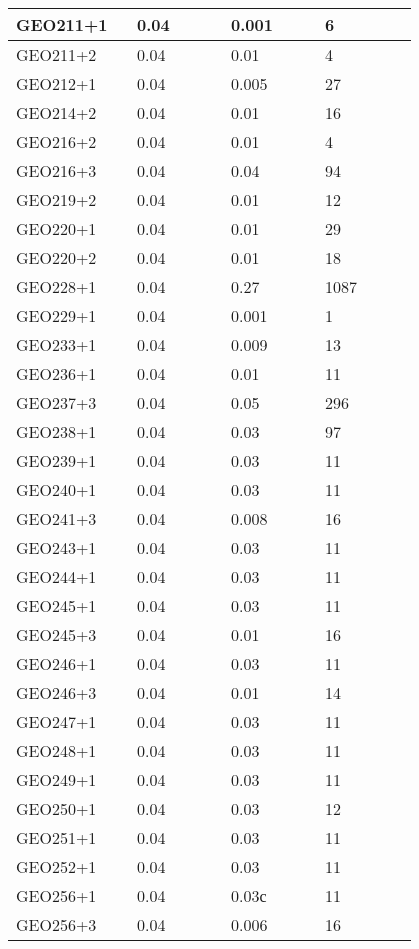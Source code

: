 \begin{longtable}[H]{|p{0.2\linewidth}|p{0.2\linewidth}|p{0.2\linewidth}|p{0.2\linewidth}|}
\hline
GEO211+1 &  0.04 &  0.001 &  6 \\
\hline
GEO211+2 &  0.04 &  0.01 &  4 \\
\hline
GEO212+1 &  0.04 &  0.005 &  27 \\
\hline
GEO214+2 &  0.04 &  0.01 &  16 \\
\hline
GEO216+2 &  0.04 &  0.01 &  4 \\
\hline
GEO216+3 &  0.04 &  0.04 &  94 \\
\hline
GEO219+2 &  0.04 &  0.01 &  12 \\
\hline
GEO220+1 &  0.04 &  0.01 &  29 \\
\hline
GEO220+2 &  0.04 &  0.01 &  18 \\
\hline
GEO228+1 &  0.04 &  0.27 &  1087 \\
\hline
GEO229+1 &  0.04 &  0.001 &  1 \\
\hline
GEO233+1 &  0.04 &  0.009 &  13 \\
\hline
GEO236+1 &  0.04 &  0.01 &  11 \\
\hline
GEO237+3 &  0.04 &  0.05 &  296 \\
\hline
GEO238+1 &  0.04 &  0.03 &  97 \\
\hline
GEO239+1 &  0.04 &  0.03 &  11 \\
\hline
GEO240+1 &  0.04 &  0.03 &  11 \\
\hline
GEO241+3 &  0.04 &  0.008 &  16 \\
\hline
GEO243+1 &  0.04 &  0.03 &  11 \\
\hline
GEO244+1 &  0.04 &  0.03 &  11 \\
\hline
GEO245+1 &  0.04 &  0.03 &  11 \\
\hline
GEO245+3 &  0.04 &  0.01 &  16 \\
\hline
GEO246+1 &  0.04 &  0.03 &  11 \\
\hline
GEO246+3 &  0.04 &  0.01 &  14 \\
\hline
GEO247+1 &  0.04 &  0.03 &  11 \\
\hline
GEO248+1 &  0.04 &  0.03 &  11 \\
\hline
GEO249+1 &  0.04 &  0.03 &  11 \\
\hline
GEO250+1 &  0.04 &  0.03 &  12 \\
\hline
GEO251+1 &  0.04 &  0.03 &  11 \\
\hline
GEO252+1 &  0.04 &  0.03 &  11 \\
\hline
GEO256+1 &  0.04 &  0.03с &  11 \\
\hline
GEO256+3 &  0.04 &  0.006 &  16 \\
\hline

\end{longtable}
